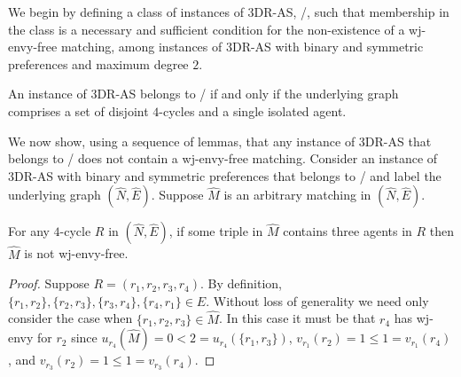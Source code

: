 We begin by defining a class of instances of 3DR-AS, \iwjnomaxdegreetwofamily/, such that membership in the class is a necessary and sufficient condition for the non-existence of a wj-envy-free matching, among instances of 3DR-AS with binary and symmetric preferences and maximum degree $2$.

\begin{mydefinition}[\iwjnomaxdegreetwofamily/]
\label{def:threed_efr_as_wjef_max_deg_2_ino}
\begin{adjustwidth}{8pt}{8pt}
    An instance of 3DR-AS belongs to \iwjnomaxdegreetwofamily/ if and only if the underlying graph comprises a set of disjoint $4$-cycles and a single isolated agent.
    \end{adjustwidth}
\end{mydefinition}

We now show, using a sequence of lemmas, that any instance of 3DR-AS that belongs to \iwjnomaxdegreetwofamily/ does not contain a wj-envy-free matching. Consider an instance of 3DR-AS with binary and symmetric preferences that belongs to \iwjnomaxdegreetwofamily/ and label the underlying graph $(\hat{N}, \hat{E})$. Suppose $\hat{M}$ is an arbitrary matching in $(\hat{N}, \hat{E})$.

\begin{lem}
\label{lem:threed_efr_as_wjenvy_maxdeg2_no3plus1c4s}
For any $4$-cycle $R$ in $(\hat{N}, \hat{E})$, if some triple in $\hat{M}$ contains three agents in $R$ then $\hat{M}$ is not wj-envy-free.
\end{lem}
\begin{proof}
Suppose $R=(r_1, r_2, r_3, r_4)$. By definition, $\{ r_1, r_2 \}, \{ r_2, r_3 \}, \{ r_3, r_4 \}, \{ r_4, r_1 \} \in E$. Without loss of generality we need only consider the case when $\{ r_1, r_2, r_3 \} \in \hat{M}$. In this case it must be that $r_4$ has wj-envy for $r_2$ since $u_{r_4}(\hat{M}) = 0 < 2 = u_{r_4}(\{ r_1, r_3 \})$, $v_{r_1}(r_2) = 1 \leq 1 = v_{r_1}(r_4)$, and $v_{r_3}(r_2) = 1 \leq 1 = v_{r_3}(r_4)$.
\end{proof}

